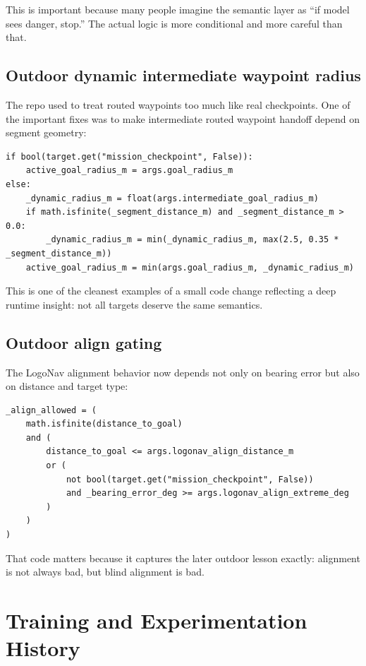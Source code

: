 \documentclass[11pt]{article}
\begin{document}
This is important because many people imagine the semantic layer as ``if model sees
danger, stop.'' The actual logic is more conditional and more careful than that.

\subsection{Outdoor dynamic intermediate waypoint radius}

The repo used to treat routed waypoints too much like real checkpoints. One of the
important fixes was to make intermediate routed waypoint handoff depend on segment
geometry:

\begin{lstlisting}
if bool(target.get("mission_checkpoint", False)):
    active_goal_radius_m = args.goal_radius_m
else:
    _dynamic_radius_m = float(args.intermediate_goal_radius_m)
    if math.isfinite(_segment_distance_m) and _segment_distance_m > 0.0:
        _dynamic_radius_m = min(_dynamic_radius_m, max(2.5, 0.35 * _segment_distance_m))
    active_goal_radius_m = min(args.goal_radius_m, _dynamic_radius_m)
\end{lstlisting}

This is one of the cleanest examples of a small code change reflecting a deep
runtime insight: not all targets deserve the same semantics.

\subsection{Outdoor align gating}

The LogoNav alignment behavior now depends not only on bearing error but also on
distance and target type:

\begin{lstlisting}
_align_allowed = (
    math.isfinite(distance_to_goal)
    and (
        distance_to_goal <= args.logonav_align_distance_m
        or (
            not bool(target.get("mission_checkpoint", False))
            and _bearing_error_deg >= args.logonav_align_extreme_deg
        )
    )
)
\end{lstlisting}

That code matters because it captures the later outdoor lesson exactly:
alignment is not always bad, but blind alignment is bad.

\section{Training and Experimentation History}
\end{document}

